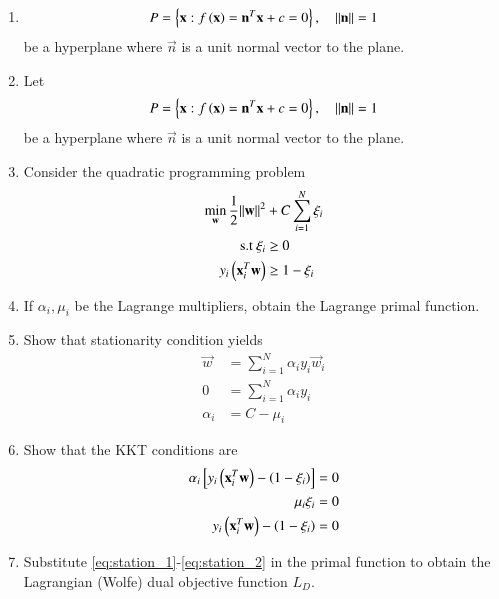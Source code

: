 \documentclass[journal,12pt,twocolumn]{IEEEtran}
\renewcommand\thesection{\arabic{section}}
\begin{document}
\begin{enumerate}[label=\thesection.\arabic*,ref=\thesection.\theenumi]
%
\item 
\begin{align}
P = \left\{\mathbf{x}:f\left(\mathbf{x}\right)=\mathbf{n}^T\mathbf{x} +c = 0\right\}, \quad \lVert\mathbf{n}\rVert = 1
\end{align}
be a hyperplane where $\vec{n}$ is a unit normal vector to the plane.

\item Let 
\begin{align}
P = \left\{\mathbf{x}:f\left(\mathbf{x}\right)=\mathbf{n}^T\mathbf{x} +c = 0\right\}, \quad \lVert\mathbf{n}\rVert = 1
\end{align}
%
be a hyperplane where $\vec{n}$ is a unit normal vector to the plane.
%
\item Consider the quadratic programming problem
%
\begin{align}
\min_{\mathbf{w}}\frac{1}{2}\lVert\mathbf{w}\rVert^2 &+ C \sum_{i=1}^{N}\xi_i
\\
\text{s.t } \xi_i &\ge 0 
\\ 
y_i\left(\mathbf{x}_i^T\mathbf{w}\right)&\ge1-\xi_i
\end{align}
\item If $\alpha_i, \mu_i$  be the Lagrange multipliers, obtain the Lagrange primal function.
\item  Show that stationarity condition yields
%
\begin{align}
\label{eq:station_1}
\vec{w} &= \sum_{i=1}^{N}\alpha_iy_i \vec{w}_i
\\
0 &= \sum_{i=1}^{N}\alpha_iy_i 
\\
\alpha_i &= C - \mu_i
\label{eq:station_2}
\end{align}
\item Show that the KKT conditions are
\begin{align}
\alpha_i {}\left[y_i \left(\mathbf{x}_i^T\mathbf{w}\right)- \left(1-\xi_i\right)\right] &= 0 
\\
\mu_i \xi_i &= 0
\\
y_i \left(\mathbf{x}_i^T\mathbf{w}\right)- \left(1-\xi_i\right) & = 0
\end{align}
\item Substitute \eqref{eq:station_1}-\eqref{eq:station_2} in the primal function to obtain the Lagrangian 
(Wolfe) dual objective function $L_D$.  
\end{enumerate}
	

	
\end{document}

